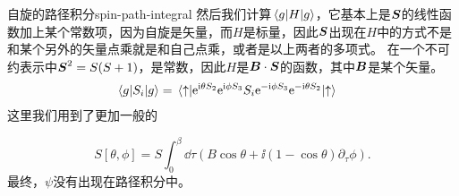 \begin{back}{自旋的路径积分}{spin-path-integral}
    然后我们计算$\mel*{g}{H}{g}$，它基本上是$\vb*{S}$的线性函数加上某个常数项，因为自旋是矢量，而$H$是标量，因此$\vb*{S}$出现在$H$中的方式不是和某个另外的矢量点乘就是和自己点乘，或者是以上两者的多项式。
    在一个不可约表示中$\vb*{S}^2 = S(S+1)$，是常数，因此$H$是$\vb*{B} \cdot \vb*{S}$的函数，其中$\vb*{B}$是某个矢量。
    \[
        \begin{aligned}
            \mel*{g}{S_i}{g} &= \mel*{\uparrow}{\mathrm{e}^{\mathrm{i} \theta S_2} \mathrm{e}^{\mathrm{i} \phi S_3} S_i \mathrm{e}^{- \mathrm{i} \phi S_3} \mathrm{e}^{- \mathrm{i} \theta S_2}}{\uparrow}
        \end{aligned}
    \]
    这里我们用到了更加一般的

    \begin{equation}
        S[\theta, \phi] = S \int_0^\beta \dd{\tau} (B \cos \theta + \ii (1 - \cos \theta) \partial_\tau \phi).
    \end{equation}
    最终，$\psi$没有出现在路径积分中。
\end{back}

